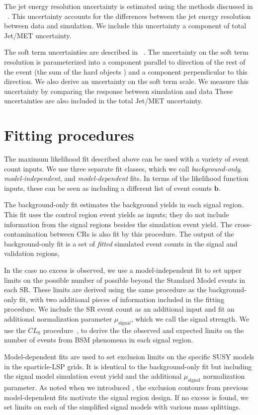 The jet energy resolution uncertainty is estimated using the methods discussed in ~\cite{Aad:2012ag,ATL-PHYS-PUB-2015-015}.
This uncertainty accounts for the differences between the jet energy resolution between data and simulation.
We include this uncertainty a component of total Jet/MET uncertainty.

The \met soft term uncertainties are described in ~\cite{PERF-2014-04,ATL-PHYS-PUB-2015-023,ATL-PHYS-PUB-2015-027}.
The uncertainty on the \met soft term resolution is parameterized into a component parallel to direction of the rest of the event (the sum of the hard objects \pt) and a component perpendicular to this direction.
We also derive an uncertainty on the \met soft term scale.
We measure this uncertainty by comparing the \met response between simulation and data
These uncertainties are also included in the total Jet/MET uncertainty.

\section{Fitting procedures}

The maximum likelihood fit described above can be used with a variety of event count inputs.
We use three separate fit classes, which we call \textit{background-only}, \textit{model-independent}, and \textit{model-dependent} fits.
In terms of the likelihood function inputs, these can be seen as including a different list of event counts $\bm{b}$.

The background-only fit estimates the background yields in each signal region.
This fit uses the control region event yields as inputs; they do not include information from the signal regions besides the simulation event yield.
The cross-contamination between CRs is also fit by this procedure.
The output of the background-only fit is a set of \textit{fitted} simulated event counts in the signal and validation regions,

In the case no excess is observed, we use a model-independent fit to set upper limits on the possible number of possible beyond the Standard Model events in each SR.
These limits are derived using the same procedure as the background-only fit, with two additional pieces of information included in the fitting procedure.
We include the SR event count as an additional input and fit an additional normalization parameter $\mu_{\text{signal}}$, which we call the signal strength.
We use the $CL_{\mathrm{S}}$ procedure~\cite{Feldman:1997qc}, to derive the the observed and expected limits on the number of events from BSM phenomena in each signal region.

Model-dependent fits are used to set exclusion limits on the specific SUSY models in the sparticle-LSP grids.
It is identical to the background-only fit but including the signal model simulation event yield and the additional $\mu_{\text{signal}}$ normalization parameter.
As noted when we introduced , the exclusion contours from previous model-dependent fits motivate the signal region design.
If no excess is found, we set limits on each of the simplified signal models with various mass splittings.